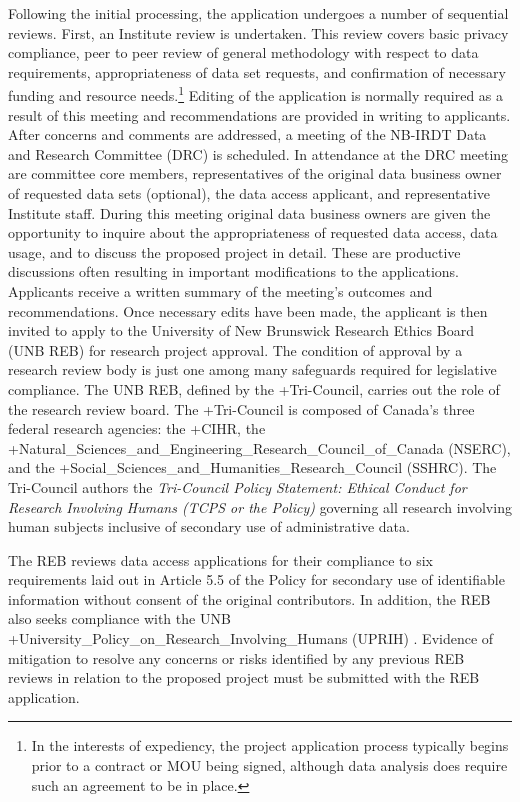 \documentclass[
]{book}
\begin{document}
Following the initial processing, the application undergoes a number of sequential reviews. First, an Institute review is undertaken. This review covers basic privacy compliance, peer to peer review of general methodology with respect to data requirements, appropriateness of data set requests, and confirmation of necessary funding and resource needs.\footnote{In the interests of expediency, the project application process typically begins prior to a contract or MOU being signed, although data analysis does require such an agreement to be in place.} Editing of the application is normally required as a result of this meeting and recommendations are provided in writing to applicants. After concerns and comments are addressed, a meeting of the NB-IRDT Data and Research Committee (DRC) is scheduled. In attendance at the DRC meeting are committee core members, representatives of the original data business owner of requested data sets (optional), the data access applicant, and representative Institute staff. During this meeting original data business owners are given the opportunity to inquire about the appropriateness of requested data access, data usage, and to discuss the proposed project in detail. These are productive discussions often resulting in important modifications to the applications. Applicants receive a written summary of the meeting's outcomes and recommendations. Once necessary edits have been made, the applicant is then invited to apply to the University of New Brunswick Research Ethics Board (UNB REB) for research project approval. The condition of approval by a research review body is just one among many safeguards required for legislative compliance. The UNB REB, defined by the +Tri-Council\textbar, carries out the role of the research review board. The +Tri-Council\textbar{} is composed of Canada's three federal research agencies: the +CIHR\textbar, the +Natural\_Sciences\_and\_Engineering\_Research\_Council\_of\_Canada\textbar{} (NSERC), and the +Social\_Sciences\_and\_Humanities\_Research\_Council\textbar{} (SSHRC). The Tri-Council authors the \emph{Tri-Council Policy Statement: Ethical Conduct for Research Involving Humans (TCPS or the Policy)} \citep{governmentofcanadainteragencyadvisorypanelonresearchethics2020} governing all research involving human subjects inclusive of secondary use of administrative data.

The REB reviews data access applications for their compliance to six requirements laid out in Article 5.5 of the Policy for secondary use of identifiable information without consent of the original contributors. In addition, the REB also seeks compliance with the UNB +University\_Policy\_on\_Research\_Involving\_Humans\textbar{} (UPRIH) \citep{officeofresearchservicesuniversityofnewbrunswick2011}. Evidence of mitigation to resolve any concerns or risks identified by any previous REB reviews in relation to the proposed project must be submitted with the REB application.
\end{document}

